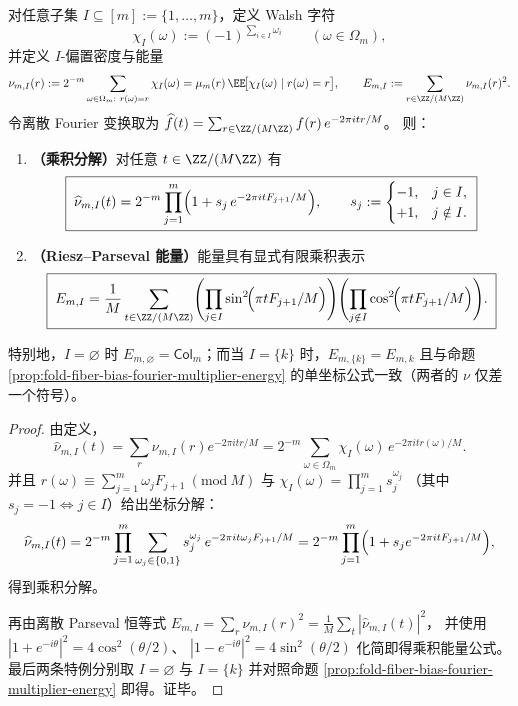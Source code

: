 \begin{theorem}\label{thm:fold-fiber-parity-bias-riesz-parseval-energy}
对任意子集 \(I\subseteq[m]:=\{1,\dots,m\}\)，定义 Walsh 字符
\[
\chi_I(\omega):=(-1)^{\sum_{i\in I}\omega_i}\qquad(\omega\in\Omega_m),
\]
并定义 \(I\)-偏置密度与能量
\[
\nu_{m,I}(r):=2^{-m}\sum_{\omega\in\Omega_m:\ r(\omega)=r}\chi_I(\omega)
=\mu_m(r)\,\EE\!\bigl[\chi_I(\omega)\mid r(\omega)=r\bigr],
\qquad
E_{m,I}:=\sum_{r\in\ZZ/(M\ZZ)}\nu_{m,I}(r)^2.
\]
令离散 Fourier 变换取为
\(
\widehat f(t)=\sum_{r\in\ZZ/(M\ZZ)} f(r)\,e^{-2\pi i tr/M}
\)。
则：
\begin{enumerate}
  \item \textbf{（乘积分解）}对任意 \(t\in\ZZ/(M\ZZ)\) 有
  \[
  \boxed{\;
  \widehat{\nu}_{m,I}(t)
  =2^{-m}\prod_{j=1}^{m}\Bigl(1+s_j\,e^{-2\pi i tF_{j+1}/M}\Bigr),\qquad
  s_j:=\begin{cases}-1,& j\in I,\\ +1,& j\notin I.\end{cases}\;}
  \]
  \item \textbf{（Riesz--Parseval 能量）}能量具有显式有限乘积表示
  \[
  \boxed{\;
  E_{m,I}
  =\frac1{M}\sum_{t\in\ZZ/(M\ZZ)}
  \Biggl(\prod_{j\in I}\sin^2\!\Bigl(\pi tF_{j+1}/M\Bigr)\Biggr)
  \Biggl(\prod_{j\notin I}\cos^2\!\Bigl(\pi tF_{j+1}/M\Bigr)\Biggr).\;}
  \]
\end{enumerate}
特别地，\(I=\varnothing\) 时 \(E_{m,\varnothing}=\mathsf{Col}_m\)；而当 \(I=\{k\}\) 时，\(E_{m,\{k\}}=E_{m,k}\) 且与命题 \ref{prop:fold-fiber-bias-fourier-multiplier-energy} 的单坐标公式一致（两者的 \(\nu\) 仅差一个符号）。
\end{theorem}
\begin{proof}
由定义，
\[
\widehat{\nu}_{m,I}(t)
=\sum_r \nu_{m,I}(r)e^{-2\pi i tr/M}
=2^{-m}\sum_{\omega\in\Omega_m}\chi_I(\omega)\,e^{-2\pi i t r(\omega)/M}.
\]
并且
\(
r(\omega)\equiv\sum_{j=1}^m\omega_jF_{j+1}\ (\mathrm{mod}\ M)
\)
与
\(
\chi_I(\omega)=\prod_{j=1}^{m}s_j^{\omega_j}
\)
（其中 \(s_j=-1\iff j\in I\)）给出坐标分解：
\[
\widehat{\nu}_{m,I}(t)
=2^{-m}\prod_{j=1}^{m}\sum_{\omega_j\in\{0,1\}} s_j^{\omega_j}\,e^{-2\pi i t\omega_jF_{j+1}/M}
=2^{-m}\prod_{j=1}^{m}\Bigl(1+s_j e^{-2\pi i tF_{j+1}/M}\Bigr),
\]
得到乘积分解。
\par
再由离散 Parseval 恒等式
\(
E_{m,I}=\sum_r\nu_{m,I}(r)^2=\frac1M\sum_t|\widehat\nu_{m,I}(t)|^2
\)，
并使用
\(
|1+e^{-i\theta}|^2=4\cos^2(\theta/2)
\)、
\(
|1-e^{-i\theta}|^2=4\sin^2(\theta/2)
\)
化简即得乘积能量公式。
最后两条特例分别取 \(I=\varnothing\) 与 \(I=\{k\}\) 并对照命题 \ref{prop:fold-fiber-bias-fourier-multiplier-energy} 即得。证毕。
\end{proof}

